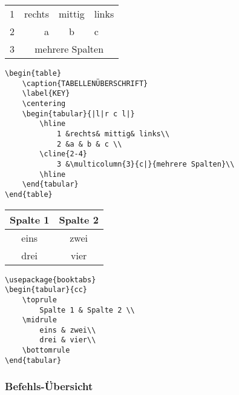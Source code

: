 \columnbreak
{}
%
\noindent\begin{minipage}{\linewidth}
	\Centering
	\begin{tabular}{|l|r c l|}
		\hline
			1 &rechts	& mittig& links\\
			2 &a 			& b 		& c \\
		\cline{2-4}
			3 &\multicolumn{3}{c|}{mehrere Spalten}\\
		\hline
	\end{tabular}
\end{minipage}

\begin{lstlisting}
\begin{table}
	\caption{TABELLENÜBERSCHRIFT}
	\label{KEY}
	\centering
	\begin{tabular}{|l|r c l|}
		\hline
			1 &rechts& mittig& links\\
			2 &a & b & c \\
		\cline{2-4}
			3 &\multicolumn{3}{c|}{mehrere Spalten}\\
		\hline
	\end{tabular}
\end{table}
\end{lstlisting}
%

\noindent\begin{minipage}{\linewidth}
\Centering
\begin{tabular}{cc}
\toprule
Spalte 1 & Spalte 2 \\
\midrule
eins & zwei\\
drei & vier\\
\bottomrule
\end{tabular}
\end{minipage}
%
\begin{lstlisting}
\usepackage{booktabs}
\begin{tabular}{cc}
	\toprule
		Spalte 1 & Spalte 2 \\
	\midrule
		eins & zwei\\
		drei & vier\\
	\bottomrule
\end{tabular}
\end{lstlisting}


\vspace{-1\baselineskip}
\subsubsection*{Befehls-Übersicht}
\negAbstand

